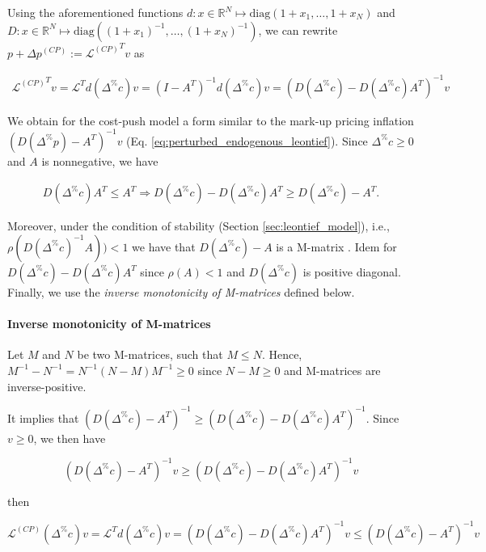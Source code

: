 \documentclass{article}
\begin{document}
Using the aforementioned functions $d:x \in \mathbb{R}^N \mapsto \text{diag} \left( {1 + x_1}, \dots, {1 + x_N} \right)$ and $D:x \in \mathbb{R}^N \mapsto \text{diag} \left( (1 + x_1)^{-1}, \dots, (1 + x_N)^{-1} \right)$, we can rewrite $p + \Delta p^{(CP)} := {\mathcal{L}^{(CP)}}^T v$ as

\begin{align*}
    {\mathcal{L}^{(CP)}}^T v = \mathcal{L}^T d(\Delta^{\%} c) v = \left( I - A^T \right)^{-1} d(\Delta^{\%} c) v = \left( D(\Delta^{\%} c) - D(\Delta^{\%} c) A^T \right)^{-1} v
\end{align*}

\noindent We obtain for the cost-push model a form similar to the mark-up pricing inflation $\left( D(\Delta^\% p) - A^T \right)^{-1}v$ (Eq. \eqref{eq:perturbed_endogenous_leontief}). 
Since $\Delta^{\%} c \geq 0$ and $A$ is nonnegative, we have

\begin{align*}
D(\Delta^{\%} c) A^T \leq A^T \Rightarrow D(\Delta^{\%} c) - D(\Delta^{\%} c) A^T \geq D(\Delta^{\%} c) - A^T. 
\end{align*}

\noindent Moreover, under the condition of stability (Section \ref{sec:leontief_model}), i.e., $\rho(D(\Delta^\%c)^{-1}A)) < 1$ we have that $D(\Delta^{\%} c) - A$ is a M-matrix \cite{hershkowitz1988characterizations}. Idem for $D(\Delta^{\%} c) - D(\Delta^{\%} c) A^T$ since $\rho(A) < 1$ and $D(\Delta^{\%} c)$ is positive diagonal. Finally, we use the \textit{inverse monotonicity of M-matrices} defined below. 

\paragraph{Inverse monotonicity of M-matrices} Let $M$ and $N$ be two M-matrices, such that $M \leq N$. Hence, $M^{-1}-N^{-1}=N^{-1}(N-M)M^{-1} \geq 0$ since $N-M \geq 0$ and M-matrices are inverse-positive. 

\vspace{0.1cm}

\noindent It implies that $(D(\Delta^{\%} c) - A^T)^{-1} \geq (D(\Delta^{\%} c) - D(\Delta^{\%} c) A^T)^{-1}$. Since $v \geq 0$, we then have 

\[ (D(\Delta^{\%} c) - A^T)^{-1} v \geq (D(\Delta^{\%} c) - D(\Delta^{\%} c) A^T)^{-1} v \]

\noindent then

\[ \mathcal{L}^{(CP)} (\Delta^{\%} c) v = \mathcal{L}^T d(\Delta^{\%} c) v = (D(\Delta^{\%} c) - D(\Delta^{\%} c) A^T)^{-1} v \leq (D(\Delta^{\%} c) - A^T)^{-1} v \]
\end{document}
